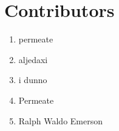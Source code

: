 \section{Contributors}
\begin{enumerate}
	\item permeate
	\item aljedaxi
	\item i dunno
	\item Permeate
	\item Ralph Waldo Emerson
\end{enumerate}